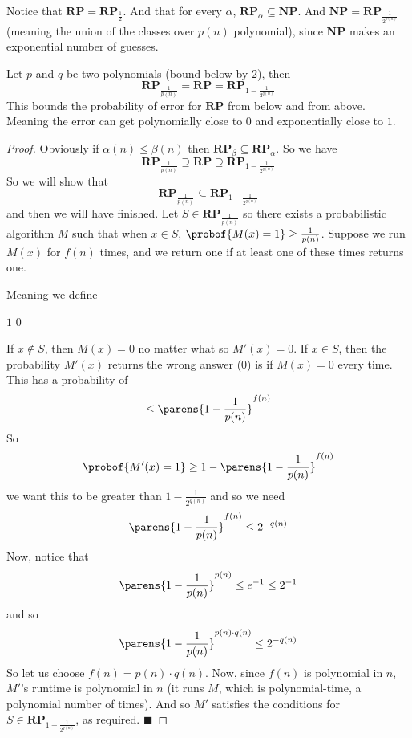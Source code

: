 \documentclass[10pt]{article}
\def\NP{\mathbf{NP}}
\def\RP{\mathbf{RP}}
\def\qed{%
    \ifmmode%
        \eqno\blacksquare%
    \else%
        \hskip1cm\allowbreak\hbox{}\nobreak\hfill$\blacksquare$%
    \fi%
}
\begin{document}
Notice that $\RP=\RP_{\frac12}$.
And that for every $\alpha$, $\RP_\alpha\subseteq\NP$.
And $\NP=\RP_{\frac1{2^{p(n)}}}$ (meaning the union of the classes over $p(n)$ polynomial), since $\NP$ makes an exponential number of guesses.

\begin{prop*}

    Let $p$ and $q$ be two polynomials (bound below by $2$), then
    \[ \RP_{\frac1{p(n)}} = \RP = \RP_{1-\frac1{2^{q(n)}}} \]
    This bounds the probability of error for $\RP$ from below and from above.
    Meaning the error can get polynomially close to $0$ and exponentially close to $1$.

\end{prop*}

\begin{proof}

    Obviously if $\alpha(n)\leq\beta(n)$ then $\RP_\beta\subseteq\RP_\alpha$.
    So we have
    \[ \RP_{\frac1{p(n)}} \supseteq \RP \supseteq \RP_{1-\frac1{2^{q(n)}}} \]
    So we will show that
    \[ \RP_{\frac1{p(n)}} \subseteq \RP_{1-\frac1{2^{q(n)}}} \]
    and then we will have finished.
    Let $S\in\RP_{\frac1{p(n)}}$ so there exists a probabilistic algorithm $M$ such that when $x\in S$, $\probof{M(x)=1}\geq\frac1{p(n)}$.
    Suppose we run $M(x)$ for $f(n)$ times, and we return one if at least one of these times returns one.

    Meaning we define

    \algorithm
                 \Return $1$
            \EndRepeat
            \State\Return $0$
        \EndFunc
    \ealgorithm

    If $x\notin S$, then $M(x)=0$ no matter what so $M'(x)=0$.
    If $x\in S$, then the probability $M'(x)$ returns the wrong answer ($0$) is if $M(x)=0$ every time.
    This has a probability of
    \[ \leq \parens{1-\frac1{p(n)}}^{f(n)} \]
    So
    \[ \probof{M'(x)=1} \geq 1 - \parens{1-\frac1{p(n)}}^{f(n)} \]
    we want this to be greater than $1-\frac1{2^{q(n)}}$ and so we need
    \[ \parens{1-\frac1{p(n)}}^{f(n)} \leq 2^{-q(n)} \]
    Now, notice that
    \[ \parens{1-\frac1{p(n)}}^{p(n)} \leq e^{-1} \leq 2^{-1} \]
    and so
    \[ \parens{1-\frac1{p(n)}}^{p(n)\cdot q(n)} \leq 2^{-q(n)} \]
    So let us choose $f(n)=p(n)\cdot q(n)$.
    Now, since $f(n)$ is polynomial in $n$, $M'$'s runtime is polynomial in $n$ (it runs $M$, which is polynomial-time, a polynomial number of times).
    And so $M'$ satisfies the conditions for $S\in\RP_{1-\frac1{2^{q(n)}}}$, as required.
    \qed

\end{proof}
\end{document}
